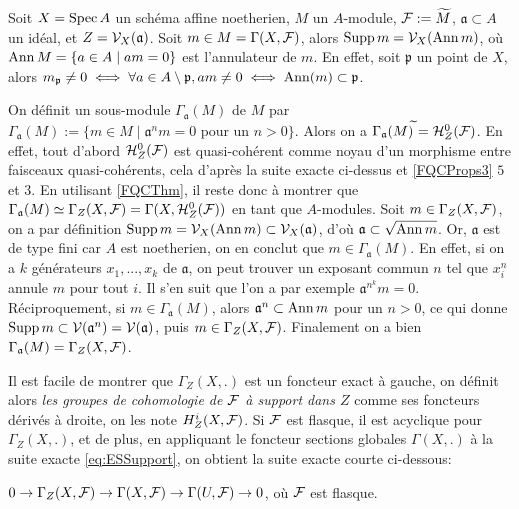 \begin{ex}\label{cohomsupportaffineex}
Soit $X=\operatorname{Spec} A$ un schéma affine noetherien, $M$ un $A$-module, $\mathcal{F}:=\widetilde{M}$, $\mathfrak{a}\subset A$ un idéal, et $Z=\mathcal{V}_X(\mathfrak{a})$. Soit $m\in M=\Gamma(X,\mathcal{F})$, alors $\operatorname{Supp} m=\mathcal{V}_X(\operatorname{Ann} m)$, où $\operatorname{Ann} M=\lbrace a\in A\mid am=0\rbrace$ est l'annulateur de $m$. En effet, soit $\mathfrak{p}$ un point de $X$, alors $m_\mathfrak{p}\neq 0\iff \forall a\in A\setminus \mathfrak{p}, am\neq 0\iff \operatorname{Ann}(m)\subset \mathfrak{p}$.

On définit un sous-module $\Gamma_\mathfrak{a}(M)$ de $M$ par $\Gamma_\mathfrak{a}(M):=\lbrace m\in M\mid \mathfrak{a}^nm=0 \text{ pour un } n>0 \rbrace$. Alors on a $\Gamma_\mathfrak{a}(M)^{\widetilde{}} = \mathcal{H} ^0 _Z(\mathcal{F})$. En effet, tout d'abord $\mathcal{H}^0 _Z(\mathcal{F})$ est quasi-cohérent comme noyau d'un morphisme entre faisceaux quasi-cohérents, cela d'après la suite exacte ci-dessus et \ref{FQCProps3} $5$ et $3$. En utilisant \ref{FQCThm}, il reste donc à montrer que $\Gamma_\mathfrak{a}(M)\simeq\Gamma_Z(X,\mathcal{F})=\Gamma(X,\mathcal{H} ^0 _Z(\mathcal{F}))$ en tant que $A$-modules. Soit $m\in\Gamma_Z(X,\mathcal{F})$, on a par définition $\operatorname{Supp} m=\mathcal{V}_X(\operatorname{Ann} m)\subset \mathcal{V}_X(\mathfrak{a})$, d'où $\mathfrak{a}\subset \sqrt{\operatorname{Ann} m}$. Or, $\mathfrak{a}$ est de type fini car $A$ est noetherien, on en conclut que $m\in \Gamma_\mathfrak{a}(M)$. En effet, si on a $k$ générateurs $x_1,...,x_k$ de $\mathfrak{a}$, on peut trouver un exposant commun $n$ tel que $x^n_i$ annule $m$ pour tout $i$. Il s'en suit que l'on a par exemple $\mathfrak{a}^{n^k}m=0$. Réciproquement, si $m\in \Gamma_\mathfrak{a}(M)$, alors $\mathfrak{a}^n\subset \operatorname{Ann} m$ pour un $n>0$, ce qui donne $\operatorname{Supp} m \subset\mathcal{V}(\mathfrak{a}^n)=\mathcal{V}(\mathfrak{a})$, puis $m\in \Gamma_Z(X,\mathcal{F})$. Finalement on a bien $\Gamma_\mathfrak{a}(M)=\Gamma_Z(X,\mathcal{F})$.
\end{ex}

Il est facile de montrer que $\Gamma_Z(X, .)$ est un foncteur exact à gauche, on définit alors \textit{les groupes de cohomologie de $\mathcal{F}$ à support dans $Z$} comme ses foncteurs dérivés à droite, on les note $H_Z^i(X,\mathcal{F})$. Si $\mathcal{F}$ est flasque, il est acyclique pour $\Gamma_Z(X, .)$, et de plus, en appliquant le foncteur sections globales $\Gamma(X,.)$ à la suite exacte \ref{eq:ESSupport}, on obtient la suite exacte courte ci-dessous:

\begin{center}
$0\rightarrow \Gamma_Z(X,\mathcal{F})\rightarrow \Gamma(X,\mathcal{F})\rightarrow \Gamma(U,\mathcal{F})\rightarrow 0$, où $\mathcal{F}$ est flasque.
\end{center}

